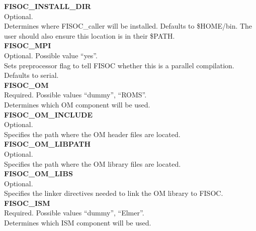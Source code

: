 \documentclass[12pt]{article}
\begin{document}
\begin{flushleft}
\textbf{FISOC\_INSTALL\_DIR}                       \\ 
Optional.                                          \\
Determines where FISOC\_caller will be installed. Defaults to \$HOME/bin. 
The user should also ensure this location is in their \$PATH. \\
\vspace{6pt}
\textbf{FISOC\_MPI}                                \\ 
Optional. Possible value ``yes''.                  \\
Sets preprocessor flag to tell FISOC whether this is a parallel compilation.
Defaults to serial.                                \\
\vspace{6pt}
\textbf{FISOC\_OM}                                 \\ 
Required. Possible values ``dummy'', ``ROMS''.     \\
Determines which OM component will be used.        \\
\vspace{6pt}
\textbf{FISOC\_OM\_INCLUDE}                       \\ 
Optional.                                          \\
Specifies the path where the OM header files are located.\\
\vspace{6pt}
\textbf{FISOC\_OM\_LIBPATH}                       \\
Optional.                                          \\
Specifies the path where the OM library files are located.\\
\vspace{6pt}
\textbf{FISOC\_OM\_LIBS}                          \\
Optional.                                          \\
Specifies the linker directives needed to link the OM library to FISOC. \\
\vspace{6pt}
\textbf{FISOC\_ISM}                                \\
Required. Possible values ``dummy'', ``Elmer''.    \\
Determines which ISM component will be used.       \\
\vspace{6pt}

\end{flushleft}
\end{document}
